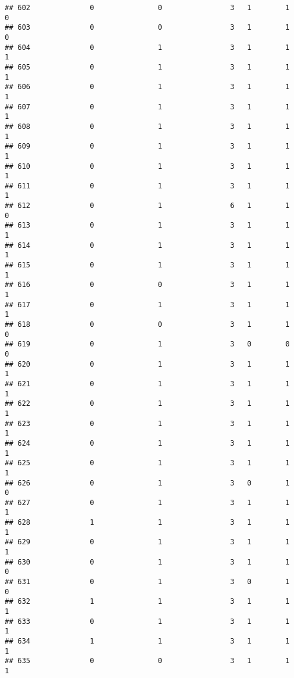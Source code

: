 \documentclass[]{article}
\begin{document}
\begin{verbatim}
## 602              0               0                3   1        1        0
## 603              0               0                3   1        1        0
## 604              0               1                3   1        1        1
## 605              0               1                3   1        1        1
## 606              0               1                3   1        1        1
## 607              0               1                3   1        1        1
## 608              0               1                3   1        1        1
## 609              0               1                3   1        1        1
## 610              0               1                3   1        1        1
## 611              0               1                3   1        1        1
## 612              0               1                6   1        1        0
## 613              0               1                3   1        1        1
## 614              0               1                3   1        1        1
## 615              0               1                3   1        1        1
## 616              0               0                3   1        1        1
## 617              0               1                3   1        1        1
## 618              0               0                3   1        1        0
## 619              0               1                3   0        0        0
## 620              0               1                3   1        1        1
## 621              0               1                3   1        1        1
## 622              0               1                3   1        1        1
## 623              0               1                3   1        1        1
## 624              0               1                3   1        1        1
## 625              0               1                3   1        1        1
## 626              0               1                3   0        1        0
## 627              0               1                3   1        1        1
## 628              1               1                3   1        1        1
## 629              0               1                3   1        1        1
## 630              0               1                3   1        1        0
## 631              0               1                3   0        1        0
## 632              1               1                3   1        1        1
## 633              0               1                3   1        1        1
## 634              1               1                3   1        1        1
## 635              0               0                3   1        1        1

\end{verbatim}
\end{document}
